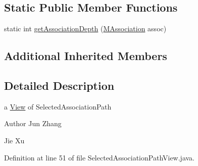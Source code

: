 \subsection*{Static Public Member Functions}
\begin{DoxyCompactItemize}
\item 
static int \hyperlink{classorg_1_1tzi_1_1use_1_1gui_1_1views_1_1selection_1_1classselection_1_1_selected_association_path_view_ae6d23876e432257b1699db1908e3bfca}{get\-Association\-Depth} (\hyperlink{interfaceorg_1_1tzi_1_1use_1_1uml_1_1mm_1_1_m_association}{M\-Association} assoc)
\end{DoxyCompactItemize}
\subsection*{Additional Inherited Members}


\subsection{Detailed Description}
a \hyperlink{interfaceorg_1_1tzi_1_1use_1_1gui_1_1views_1_1_view}{View} of Selected\-Association\-Path \begin{DoxyAuthor}{Author}
Jun Zhang 

Jie Xu 
\end{DoxyAuthor}


Definition at line 51 of file Selected\-Association\-Path\-View.\-java.



